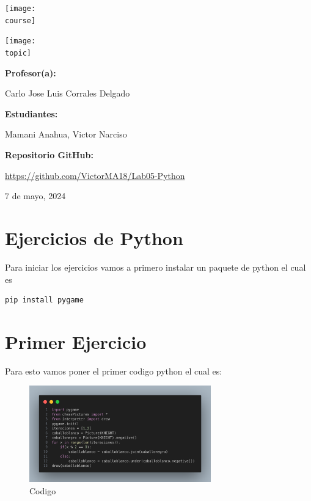 \documentclass[10pt, a4paper]{article}
\newcommand{\course}{img/web_programming}
\newcommand{\topic}{img/Python.png}
\newcommand{\professor}{Carlo Jose Luis Corrales Delgado}
\newcommand{\students}{Mamani Anahua, Victor Narciso}
\newcommand{\github}{https://github.com/VictorMA18/Lab05-Python}
\newcommand{\mydate}{7 de mayo, 2024}
\begin{document}
\begin{titlepage}
	\centering
	\texttt{[image: \\course]} \par
  \vfill \vfill
	\texttt{[image: \\topic]}\par
  \vfill \vfill
  {\textbf{Profesor(a):} \par}
	\professor \vfill
  {\textbf{Estudiantes:} \par}
	\students \vfill
  {\textbf{Repositorio GitHub:} \par}
  \href{\github}{\github} \vfill
	{\large \mydate \par}
\end{titlepage}

\section{Ejercicios de Python}
Para iniciar los ejercicios vamos a primero instalar un paquete de python el cual es 
\begin{lstlisting}[language=bash]
  pip install pygame
\end{lstlisting} 

\section{Primer Ejercicio}
Para esto vamos poner el primer codigo python el cual es:  
\begin{figure}[H]
  \centering
  \includegraphics[width=0.7\textwidth]{img/Ej1.png}
  \caption{Codigo}
\end{figure}
\end{document}
